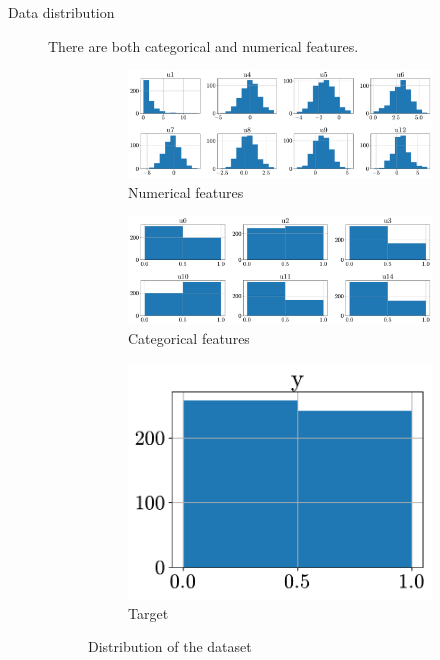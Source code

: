\begin{description}
    \item[Data distribution]
        There are both categorical and numerical features.
        \begin{figure}[H]
            \centering
            \begin{subfigure}{0.75\linewidth}
                \centering
                \includegraphics[width=\linewidth]{./img/_biomed_numeric_distr.pdf}
                \caption{Numerical features}
            \end{subfigure}
            \begin{subfigure}{0.75\linewidth}
                \centering
                \includegraphics[width=\linewidth]{./img/_biomed_categ_distr.pdf}
                \caption{Categorical features}
            \end{subfigure}
            \begin{subfigure}{0.2\linewidth}
                \centering
                \includegraphics[width=\linewidth]{./img/_biomed_target_distr.pdf}
                \caption{Target}
            \end{subfigure}
            \caption{Distribution of the dataset}
        \end{figure}


\end{description}
